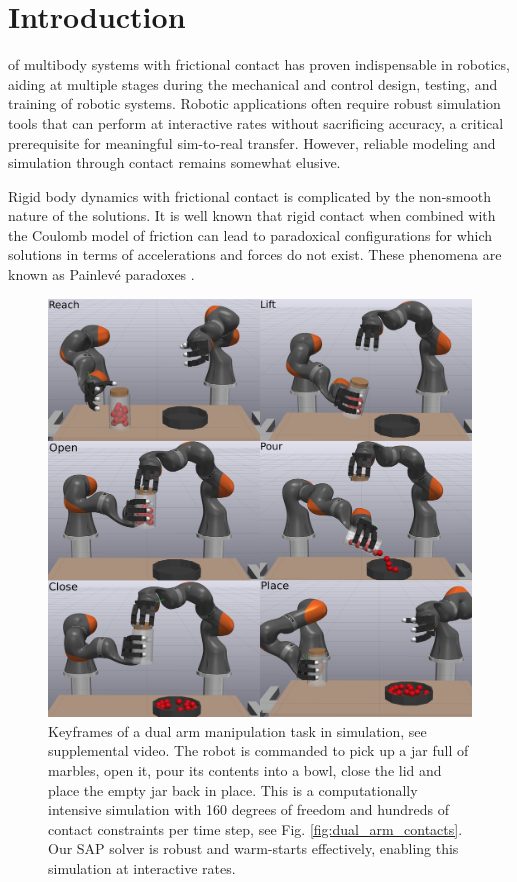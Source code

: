 
\section{Introduction}
\label{sec:introduction}

 of multibody systems with frictional contact has
proven indispensable in robotics, aiding at multiple stages during the
mechanical and control design, testing, and training of robotic systems.
Robotic applications often require robust simulation tools that can perform at
interactive rates without sacrificing accuracy, a critical prerequisite for
meaningful sim-to-real transfer. However, reliable modeling and simulation
through contact remains somewhat elusive.

Rigid body dynamics with frictional contact is complicated by the non-smooth
nature of the solutions. It is well known \cite{bib:baraff1993issues} that rigid
contact when combined with the Coulomb model of friction can lead to paradoxical
configurations for which solutions in terms of accelerations and forces do not
exist. These phenomena are known as Painlev\'e paradoxes
\cite{bib:hogan2017regularization}.
%
\begin{figure}[!ht]
	\centering
    \includegraphics[width=0.95\columnwidth]{figures/dual_arm/tiled.png}
	\caption{\label{fig:dual_arm_frames}
    Keyframes of a dual arm manipulation task in simulation, see supplemental
    video. The robot is commanded to pick up a jar full of marbles, open it,
    pour its contents into a bowl, close the lid and place the empty jar back in
    place. This is a computationally intensive simulation with 160 degrees of
    freedom and hundreds of contact constraints per time step, see Fig.
    \ref{fig:dual_arm_contacts}. Our SAP solver is robust and warm-starts
    effectively, enabling this simulation at interactive rates.}
\end{figure}
